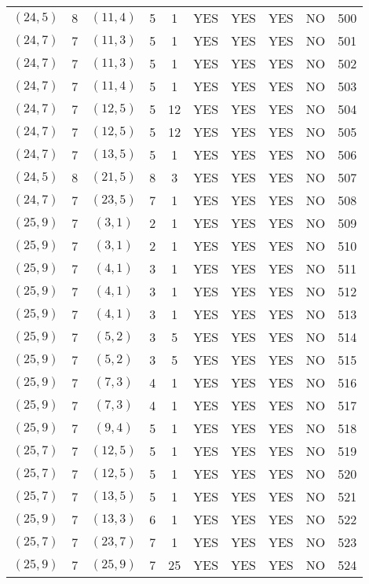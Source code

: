 \begin{longtable}{|c|c|c|c|c|c|c|c|c|c|}
$(24, 5)$ & 8 & $(11, 4)$ & 5 & 1 & YES & YES & YES & NO & 500\\
$(24, 7)$ & 7 & $(11, 3)$ & 5 & 1 & YES & YES & YES & NO & 501\\
$(24, 7)$ & 7 & $(11, 3)$ & 5 & 1 & YES & YES & YES & NO & 502\\
$(24, 7)$ & 7 & $(11, 4)$ & 5 & 1 & YES & YES & YES & NO & 503\\
$(24, 7)$ & 7 & $(12, 5)$ & 5 & 12 & YES & YES & YES & NO & 504\\
$(24, 7)$ & 7 & $(12, 5)$ & 5 & 12 & YES & YES & YES & NO & 505\\
$(24, 7)$ & 7 & $(13, 5)$ & 5 & 1 & YES & YES & YES & NO & 506\\
$(24, 5)$ & 8 & $(21, 5)$ & 8 & 3 & YES & YES & YES & NO & 507\\
$(24, 7)$ & 7 & $(23, 5)$ & 7 & 1 & YES & YES & YES & NO & 508\\
$(25, 9)$ & 7 & $(3, 1)$ & 2 & 1 & YES & YES & YES & NO & 509\\
$(25, 9)$ & 7 & $(3, 1)$ & 2 & 1 & YES & YES & YES & NO & 510\\
$(25, 9)$ & 7 & $(4, 1)$ & 3 & 1 & YES & YES & YES & NO & 511\\
$(25, 9)$ & 7 & $(4, 1)$ & 3 & 1 & YES & YES & YES & NO & 512\\
$(25, 9)$ & 7 & $(4, 1)$ & 3 & 1 & YES & YES & YES & NO & 513\\
$(25, 9)$ & 7 & $(5, 2)$ & 3 & 5 & YES & YES & YES & NO & 514\\
$(25, 9)$ & 7 & $(5, 2)$ & 3 & 5 & YES & YES & YES & NO & 515\\
$(25, 9)$ & 7 & $(7, 3)$ & 4 & 1 & YES & YES & YES & NO & 516\\
$(25, 9)$ & 7 & $(7, 3)$ & 4 & 1 & YES & YES & YES & NO & 517\\
$(25, 9)$ & 7 & $(9, 4)$ & 5 & 1 & YES & YES & YES & NO & 518\\
$(25, 7)$ & 7 & $(12, 5)$ & 5 & 1 & YES & YES & YES & NO & 519\\
$(25, 7)$ & 7 & $(12, 5)$ & 5 & 1 & YES & YES & YES & NO & 520\\
$(25, 7)$ & 7 & $(13, 5)$ & 5 & 1 & YES & YES & YES & NO & 521\\
$(25, 9)$ & 7 & $(13, 3)$ & 6 & 1 & YES & YES & YES & NO & 522\\
$(25, 7)$ & 7 & $(23, 7)$ & 7 & 1 & YES & YES & YES & NO & 523\\
$(25, 9)$ & 7 & $(25, 9)$ & 7 & 25 & YES & YES & YES & NO & 524\\

\end{longtable}
